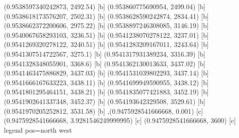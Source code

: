 {{{(0.9538597340242873, 2492.54) [b] 
(0.953860775690954, 2499.04) [b] 
(0.9538618173576207, 2502.31) [b] 
(0.9538628590242874, 2834.41) [b] 
(0.9538662372200606, 2975.22) [b] 
(0.9538897246308085, 3146.19) [b] 
(0.9540067658293103, 3236.51) [b] 
(0.9541238070278122, 3237.01) [b] 
(0.9541269320278122, 3240.51) [b] 
(0.9541283209167011, 3243.64) [b] 
(0.9541307514722567, 3275.1) [b] 
(0.9541317931389234, 3316.39) [b] 
(0.9541328348055901, 3368.6) [b] 
(0.9541362130013633, 3437.02) [b] 
(0.9541463475886829, 3437.03) [b] 
(0.9541531039802293, 3437.14) [b] 
(0.9541666167633223, 3438.11) [b] 
(0.9541699949590955, 3438.12) [b] 
(0.9541801295464151, 3438.21) [b] 
(0.9541835077421883, 3452.19) [b] 
(0.9541902641337348, 3452.37) [b] 
(0.954193642329508, 3529.61) [b] 
(0.9541970205252812, 3531.58) [b] 
},{(0.9475928541666668, 0.001) [c] 
(0.9475928541666668, 3.9281546249999995) [c] 
(0.9475928541666668, 3600) [c] 
}}}{legend pos=north west}